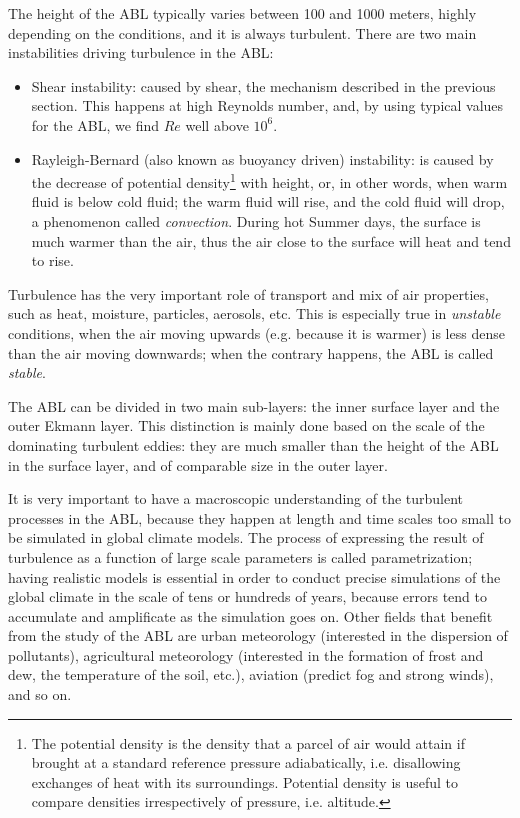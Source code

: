 \documentclass[a4paper,11pt]{kth-mag}
\begin{document}
The height of the ABL typically varies between 100 and 1000 meters, highly depending on the conditions, and it is always turbulent. There are two main instabilities driving turbulence in the ABL:

\begin{itemize}
\item Shear instability: caused by shear, the mechanism described in the previous section. This happens at high Reynolds number, and, by using typical values for the ABL, we find $Re$ well above $10^6$.
\item Rayleigh-Bernard (also known as buoyancy driven) instability: is caused by the decrease of potential density\footnote{The potential density is the density that a parcel of air would attain if brought at a standard reference pressure adiabatically, i.e. disallowing exchanges of heat with its surroundings. Potential density is useful to compare densities irrespectively of pressure, i.e. altitude.} with height, or, in other words, when warm fluid is below cold fluid; the warm fluid will rise, and the cold fluid will drop, a phenomenon called \emph{convection}. During hot Summer days, the surface is much warmer than the air, thus the air close to the surface will heat and tend to rise.
\end{itemize}

Turbulence has the very important role of transport and mix of air properties, such as heat, moisture, particles, aerosols, etc. This is especially true in \emph{unstable} conditions, when the air moving upwards (e.g. because it is warmer) is less dense than the air moving downwards; when the contrary happens, the ABL is called \emph{stable}.

The ABL can be divided in two main sub-layers: the inner surface layer and the outer Ekmann layer. This distinction is mainly done based on the scale of the dominating turbulent eddies: they are much smaller than the height of the ABL in the surface layer, and of comparable size in the outer layer.

It is very important to have a macroscopic understanding of the turbulent processes in the ABL, because they happen at length and time scales too small to be simulated in global climate models. The process of expressing the result of turbulence as a function of large scale parameters is called parametrization; having realistic models is essential in order to conduct precise simulations of the global climate in the scale of tens or hundreds of years, because errors tend to accumulate and amplificate as the simulation goes on. Other fields that benefit from the study of the ABL are urban meteorology (interested in the dispersion of pollutants), agricultural meteorology (interested in the formation of frost and dew, the temperature of the soil, etc.), aviation (predict fog and strong winds), and so on.
\end{document}
